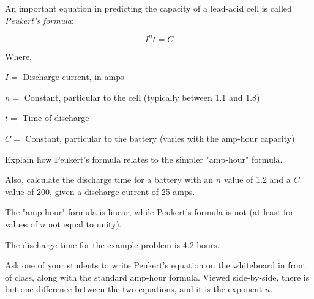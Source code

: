 

An important equation in predicting the capacity of a lead-acid cell is called {\it Peukert's formula}:

$$I^n t = C$$

\noindent
Where,

$I =$ Discharge current, in amps

$n =$ Constant, particular to the cell (typically between 1.1 and 1.8)

$t =$ Time of discharge

$C =$ Constant, particular to the battery (varies with the amp-hour capacity)

\vskip 5pt

Explain how Peukert's formula relates to the simpler "amp-hour" formula.

\vskip 10pt

Also, calculate the discharge time for a battery with an $n$ value of 1.2 and a $C$ value of 200, given a discharge current of 25 amps.







The "amp-hour" formula is linear, while Peukert's formula is not (at least for values of $n$ not equal to unity).

\vskip 10pt

The discharge time for the example problem is 4.2 hours.







Ask one of your students to write Peukert's equation on the whiteboard in front of class, along with the standard amp-hour formula.  Viewed side-by-side, there is but one difference between the two equations, and it is the exponent $n$.




